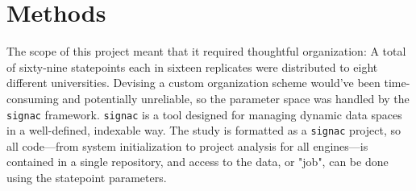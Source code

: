\section{Methods}

The scope of this project meant that it required thoughtful organization: A total of sixty-nine statepoints each in sixteen replicates were distributed to eight different universities.
Devising a custom organization scheme would've been time-consuming and potentially unreliable, so the parameter space was handled by the \texttt{signac} framework\cite{Adorf2018, signac_zenodo, signac_scipy_2018, signac_scipy_2021}.
\texttt{signac} is a tool designed for managing dynamic data spaces in a well-defined, indexable way.
The study is formatted as a \texttt{signac} project, so all code---from system initialization to project analysis for all engines---is contained in a single repository, and access to the data, or "job", can be done using the statepoint parameters.

